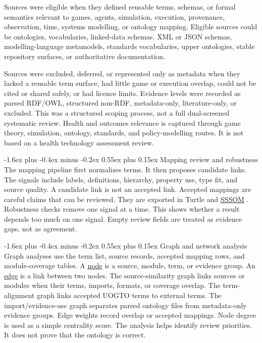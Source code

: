 \documentclass[11pt]{article}
\makeatletter
\renewcommand\subsection{\@startsection{subsection}{2}{\z@}%
  {-1.6ex plus -0.4ex minus -0.2ex}%
  {0.55ex plus 0.15ex}%
  {\normalfont\large\bfseries\color{uogtoInk}}}
\newcommand{\glslink}[2]{\hyperlink{gloss:#1}{#2}}
\newcommand{\abblink}[2]{\hyperlink{abbr:#1}{#2}}
\makeatother
\begin{document}
Sources were eligible when they defined reusable terms, schemas, or formal semantics relevant to games, agents, simulation, execution, provenance, observation, time, systems modelling, or ontology mapping. Eligible sources could be ontologies, vocabularies, linked-data schemas, XML or JSON schemas, modelling-language metamodels, standards vocabularies, upper ontologies, stable repository surfaces, or authoritative documentation.

Sources were excluded, deferred, or represented only as metadata when they lacked a reusable term surface, had little game or execution overlap, could not be cited or shared safely, or had licence limits. Evidence levels were recorded as parsed RDF/OWL, structured non-RDF, metadata-only, literature-only, or excluded. This was a structured scoping process, not a full dual-screened systematic review. Health and outcomes relevance is captured through game theory, simulation, ontology, standards, and policy-modelling routes. It is not based on a health technology assessment review.

\subsection{Mapping review and robustness}
The mapping pipeline first normalizes terms. It then proposes candidate links. The signals include labels, definitions, hierarchy, property use, type fit, and source quality. A candidate link is not an accepted link. Accepted mappings are careful claims that can be reviewed. They are exported in Turtle and \abblink{sssom}{SSSOM} \cite{sssom-2022}. Robustness checks remove one signal at a time. This shows whether a result depends too much on one signal. Empty review fields are treated as evidence gaps, not as agreement.

\subsection{Graph and network analysis}
Graph analyses use the term list, source records, accepted mapping rows, and module-coverage tables. A \glslink{node}{node} is a source, module, term, or evidence group. An \glslink{edge}{edge} is a link between two nodes. The source-similarity graph links sources or modules when their terms, imports, formats, or coverage overlap. The term-alignment graph links accepted UOGTO terms to external terms. The import/evidence-use graph separates parsed ontology files from metadata-only evidence groups. Edge weights record overlap or accepted mappings. Node degree is used as a simple centrality score. The analysis helps identify review priorities. It does not prove that the ontology is correct.
\end{document}
